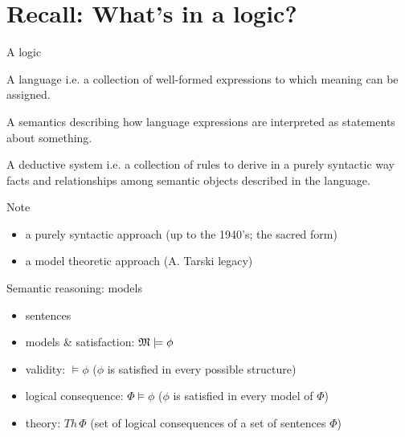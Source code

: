 \documentclass[aspectratio=169]{beamer}
\begin{document}
\frame[plain]{\titlepage}

\section{Recall: What's in a logic?}


\begin{slide}{A logic}\label{s:1}
\small
\begin{block}{A language}
i.e. a collection of well-formed expressions to which meaning can be assigned.
\end{block}
\begin{block}{A semantics}
describing how language expressions are interpreted as statements about something.
\end{block}
\begin{block}{A deductive system}
i.e. a collection of rules to derive in a purely syntactic way facts and relationships among semantic objects described in the language.
\end{block}

\begin{block}{Note}
\begin{itemize}
\item a purely syntactic approach (up to the 1940's; the \alert{sacred form})
\item a model theoretic approach (A. Tarski legacy)
\end{itemize}
\end{block}

\end{slide}


\begin{slide}{Semantic reasoning: models}\label{s:2}
\small
\begin{itemize}
\item \alert{sentences}
\item \alert{models} \& \alert{satisfaction}: $\mathfrak{M} \models \phi$
\item \alert{validity}: $\models \phi$ ($\phi$ is satisfied in every possible structure)
\item \alert{logical consequence}: $\Phi \models \phi$ ($\phi$ is satisfied in every model of $\Phi$)
\item \alert{theory}: $Th\, \Phi$ (set of logical consequences of a set of sentences $\Phi$)
\end{itemize}

\end{slide}
\end{document}
